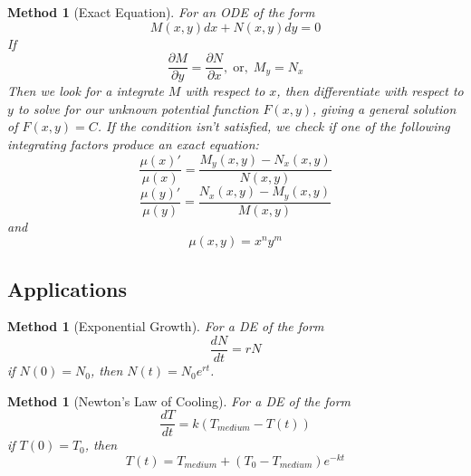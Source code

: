 \documentclass[12pt]{article}
\newtheorem{met}[thm]{Method}
\theoremstyle{definition}
\theoremstyle{remark}
\numberwithin{equation}{section}
\newcommand\diriv[2]{\ensuremath{\frac{d #1}{d #2}}}
\begin{document}
\vspace{1cm}

\begin{met}[Exact Equation]
        For an ODE of the form \begin{equation}
                M(x,y)dx + N(x,y)dy = 0
        \end{equation}
        If \begin{equation}
                \frac{\partial M}{\partial y} = \frac{\partial N}{\partial x},\;\text{or},\;M_y = N_x 
        \end{equation}
        Then we look for a integrate $M$ with respect to $x$, then differentiate with respect to $y$ to solve for our unknown potential function $F(x,y)$, giving a general solution of $F(x,y) =C$. If the condition isn't satisfied, we check if one of the following integrating factors produce an exact equation: \begin{equation}
                \frac{\mu(x)'}{\mu(x)} = \frac{M_y(x,y) - N_x(x,y)}{N(x,y)}
        \end{equation}
        \begin{equation}
                \frac{\mu(y)'}{\mu(y)} = \frac{N_x(x,y) - M_y(x,y)}{M(x,y)}
        \end{equation}
        and \begin{equation}
                \mu(x,y) = x^ny^m
        \end{equation}
\end{met}


\vspace{1cm}


\subsection{Applications}


\begin{met}[Exponential Growth]
        For a DE of the form \begin{equation}
                \frac{dN}{dt} = rN
        \end{equation}
        if $N(0) = N_0$, then $N(t) = N_0e^{rt}$.
\end{met}


\vspace{1cm}

\begin{met}[Newton's Law of Cooling]
        For a DE of the form \begin{equation}
                \diriv{T}{t} = k(T_{medium}-T(t))
        \end{equation}
        if $T(0) = T_0$, then \begin{equation}
                T(t) = T_{medium} + (T_0 - T_{medium})e^{-kt}
        \end{equation}
\end{met}
\end{document}
